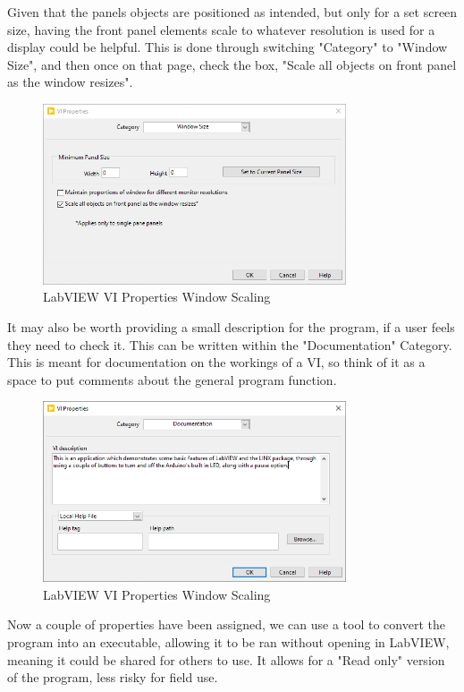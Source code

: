 \documentclass[a4paper,11pt]{report}
\begin{document}
Given that the panels objects are positioned as intended, but only for a set screen size, having the front panel elements scale to whatever resolution is used for a display could be helpful. This is done through switching "Category" to "Window Size", and then once on that page, check the box, "Scale all objects on front panel as the window resizes".

\begin{figure}[H]
\centering
\includegraphics[width=0.8\textwidth]{screenshots/labview37}
\caption{LabVIEW VI Properties Window Scaling}
\end{figure}

It may also be worth providing a small description for the program, if a user feels they need to check it. This can be written within the "Documentation" Category. This is meant for documentation on the workings of a VI, so think of it as a space to put comments about the general program function.

\begin{figure}[H]
\centering
\includegraphics[width=0.8\textwidth]{screenshots/labview38}
\caption{LabVIEW VI Properties Window Scaling}
\end{figure}

Now a couple of properties have been assigned, we can use a tool to convert the program into an executable, allowing it to be ran without opening in LabVIEW, meaning it could be shared for others to use. It allows for a "Read only" version of the program, less risky for field use.
\end{document}
